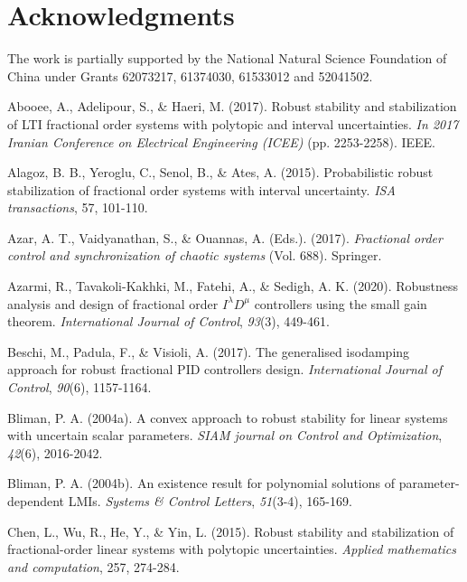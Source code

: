 \documentclass[]{interact}
\theoremstyle{plain}%
\theoremstyle{definition}
\theoremstyle{remark}
\begin{document}
\section*{Acknowledgments}
\par The work is partially supported by the National Natural Science Foundation of China under Grants 62073217, 61374030, 61533012 and 52041502.
\begin{thebibliography}{}

	Abooee, A., Adelipour, S., \& Haeri, M. (2017). Robust stability and stabilization of LTI fractional order systems with polytopic and interval uncertainties. \emph{In 2017 Iranian Conference on Electrical Engineering (ICEE)} (pp. 2253-2258). IEEE.
	
	Alagoz, B. B., Yeroglu, C., Senol, B., \& Ates, A. (2015). Probabilistic robust stabilization of fractional order systems with interval uncertainty. \emph{ISA transactions}, 57, 101-110.
	
	Azar, A. T., Vaidyanathan, S., \& Ouannas, A. (Eds.). (2017). \emph{Fractional order control and synchronization of chaotic systems} (Vol. 688). Springer.
	
	Azarmi, R., Tavakoli-Kakhki, M., Fatehi, A., \& Sedigh, A. K. (2020). Robustness analysis and design of fractional order $I^\lambda D^\mu$ controllers using the small gain theorem. \emph{International Journal of Control}, \emph{93}(3), 449-461. 
	
	Beschi, M., Padula, F., \& Visioli, A. (2017). The generalised isodamping approach for robust fractional PID controllers design. \emph{International Journal of Control}, \emph{90}(6), 1157-1164. 
	
	Bliman, P. A. (2004a). A convex approach to robust stability for linear systems with uncertain scalar parameters. \emph{SIAM journal on Control and Optimization}, \emph{42}(6), 2016-2042.
	
	Bliman, P. A. (2004b). An existence result for polynomial solutions of parameter-dependent LMIs. \emph{Systems \& Control Letters}, \emph{51}(3-4), 165-169.
	
	Chen, L., Wu, R., He, Y., \& Yin, L. (2015). Robust stability and stabilization of fractional-order linear systems with polytopic uncertainties. \emph{Applied mathematics and computation}, 257, 274-284.
	

\end{thebibliography}
\end{document}
